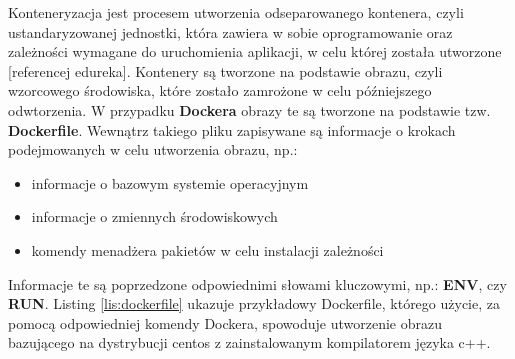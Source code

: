 Konteneryzacja jest procesem utworzenia odseparowanego kontenera, czyli ustandaryzowanej jednostki, która zawiera w sobie oprogramowanie oraz zależności wymagane do uruchomienia aplikacji, w celu której została utworzone [referencej edureka]. Kontenery są tworzone na podstawie obrazu, czyli wzorcowego środowiska, które zostało zamrożone w celu późniejszego odwtorzenia. W przypadku \textbf{Dockera} obrazy te są tworzone na podstawie tzw. \textbf{Dockerfile}. Wewnątrz takiego pliku zapisywane są informacje o krokach podejmowanych w celu utworzenia obrazu, np.:
\begin{itemize}
\item informacje o bazowym systemie operacyjnym
\item informacje o zmiennych środowiskowych
\item komendy menadżera pakietów w celu instalacji zależności
\end{itemize}
Informacje te są poprzedzone odpowiednimi słowami kluczowymi, np.: \textbf{ENV}, czy \textbf{RUN}. Listing \ref{lis:dockerfile} ukazuje przykładowy Dockerfile, którego użycie, za pomocą odpowiedniej komendy Dockera, spowoduje utworzenie obrazu bazującego na dystrybucji centos z zainstalowanym kompilatorem języka c++.

\begin{lstlisting}[label={lis:dockerfile}, language=Dockerfile, caption={Przykładowy Dockerfile}]

\end{lstlisting}

